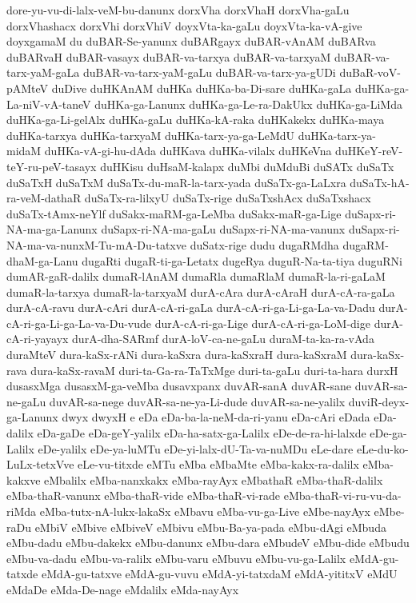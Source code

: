 {dore-yu-vu-di-lalx-veM-bu-danunx
dorxVha
dorxVhaH
dorxVha-gaLu
dorxVhashacx
dorxVhi
dorxVhiV
doyxVta-ka-gaLu
doyxVta-ka-vA-give
doyxgamaM
du
duBAR-Se-yanunx
duBARgayx
duBAR-vAnAM
duBARva
duBARvaH
duBAR-vasayx
duBAR-va-tarxya
duBAR-va-tarxyaM
duBAR-va-tarx-yaM-gaLa
duBAR-va-tarx-yaM-gaLu
duBAR-va-tarx-ya-gUDi
duBaR-voV-pAMteV
duDive
duHKAnAM
duHKa
duHKa-ba-Di-sare
duHKa-gaLa
duHKa-ga-La-niV-vA-taneV
duHKa-ga-Lanunx
duHKa-ga-Le-ra-DakUkx
duHKa-ga-LiMda
duHKa-ga-Li-gelAlx
duHKa-gaLu
duHKa-kA-raka
duHKakekx
duHKa-maya
duHKa-tarxya
duHKa-tarxyaM
duHKa-tarx-ya-ga-LeMdU
duHKa-tarx-ya-midaM
duHKa-vA-gi-hu-dAda
duHKava
duHKa-vilalx
duHKeVna
duHKeY-reV-teY-ru-peV-tasayx
duHKisu
duHsaM-kalapx
duMbi
duMduBi
duSATx
duSaTx
duSaTxH
duSaTxM
duSaTx-du-maR-la-tarx-yada
duSaTx-ga-LaLxra
duSaTx-hA-ra-veM-dathaR
duSaTx-ra-lilxyU
duSaTx-rige
duSaTxshAcx
duSaTxshacx
duSaTx-tAmx-neYlf
duSakx-maRM-ga-LeMba
duSakx-maR-ga-Lige
duSapx-ri-NA-ma-ga-Lanunx
duSapx-ri-NA-ma-gaLu
duSapx-ri-NA-ma-vanunx
duSapx-ri-NA-ma-va-nunxM-Tu-mA-Du-tatxve
duSatx-rige
dudu
dugaRMdha
dugaRM-dhaM-ga-Lanu
dugaRti
dugaR-ti-ga-Letatx
dugeRya
duguR-Na-ta-tiya
duguRNi
dumAR-gaR-dalilx
dumaR-lAnAM
dumaRla
dumaRlaM
dumaR-la-ri-gaLaM
dumaR-la-tarxya
dumaR-la-tarxyaM
durA-cAra
durA-cAraH
durA-cA-ra-gaLa
durA-cA-ravu
durA-cAri
durA-cA-ri-gaLa
durA-cA-ri-ga-Li-ga-La-va-Dadu
durA-cA-ri-ga-Li-ga-La-va-Du-vude
durA-cA-ri-ga-Lige
durA-cA-ri-ga-LoM-dige
durA-cA-ri-yayayx
durA-dha-SARmf
durA-loV-ca-ne-gaLu
duraM-ta-ka-ra-vAda
duraMteV
dura-kaSx-rANi
dura-kaSxra
dura-kaSxraH
dura-kaSxraM
dura-kaSx-rava
dura-kaSx-ravaM
duri-ta-Ga-ra-TaTxMge
duri-ta-gaLu
duri-ta-hara
durxH
dusasxMga
dusasxM-ga-veMba
dusavxpanx
duvAR-sanA
duvAR-sane
duvAR-sa-ne-gaLu
duvAR-sa-nege
duvAR-sa-ne-ya-Li-dude
duvAR-sa-ne-yalilx
duviR-deyx-ga-Lanunx
dwyx
dwyxH
e
eDa
eDa-ba-la-neM-da-ri-yanu
eDa-cAri
eDada
eDa-dalilx
eDa-gaDe
eDa-geY-yalilx
eDa-ha-satx-ga-Lalilx
eDe-de-ra-hi-lalxde
eDe-ga-Lalilx
eDe-yalilx
eDe-ya-luMTu
eDe-yi-lalx-dU-Ta-va-nuMDu
eLe-dare
eLe-du-ko-LuLx-tetxVve
eLe-vu-titxde
eMTu
eMba
eMbaMte
eMba-kakx-ra-dalilx
eMba-kakxve
eMbalilx
eMba-nanxkakx
eMba-rayAyx
eMbathaR
eMba-thaR-dalilx
eMba-thaR-vanunx
eMba-thaR-vide
eMba-thaR-vi-rade
eMba-thaR-vi-ru-vu-da-riMda
eMba-tutx-nA-lukx-lakaSx
eMbavu
eMba-vu-ga-Live
eMbe-nayAyx
eMbe-raDu
eMbiV
eMbive
eMbiveV
eMbivu
eMbu-Ba-ya-pada
eMbu-dAgi
eMbuda
eMbu-dadu
eMbu-dakekx
eMbu-danunx
eMbu-dara
eMbudeV
eMbu-dide
eMbudu
eMbu-va-dadu
eMbu-va-ralilx
eMbu-varu
eMbuvu
eMbu-vu-ga-Lalilx
eMdA-gu-tatxde
eMdA-gu-tatxve
eMdA-gu-vuvu
eMdA-yi-tatxdaM
eMdA-yititxV
eMdU
eMdaDe
eMda-De-nage
eMdalilx
eMda-nayAyx
}

